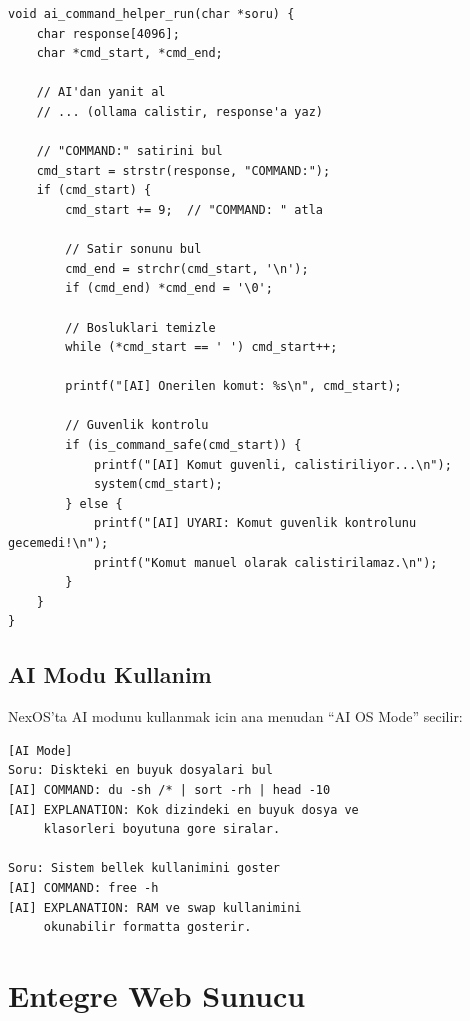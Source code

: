 \documentclass[12pt,a4paper]{report}
\begin{document}
\begin{lstlisting}[caption={AI Komut Yardimcisi}]
void ai_command_helper_run(char *soru) {
    char response[4096];
    char *cmd_start, *cmd_end;
    
    // AI'dan yanit al
    // ... (ollama calistir, response'a yaz)
    
    // "COMMAND:" satirini bul
    cmd_start = strstr(response, "COMMAND:");
    if (cmd_start) {
        cmd_start += 9;  // "COMMAND: " atla
        
        // Satir sonunu bul
        cmd_end = strchr(cmd_start, '\n');
        if (cmd_end) *cmd_end = '\0';
        
        // Bosluklari temizle
        while (*cmd_start == ' ') cmd_start++;
        
        printf("[AI] Onerilen komut: %s\n", cmd_start);
        
        // Guvenlik kontrolu
        if (is_command_safe(cmd_start)) {
            printf("[AI] Komut guvenli, calistiriliyor...\n");
            system(cmd_start);
        } else {
            printf("[AI] UYARI: Komut guvenlik kontrolunu gecemedi!\n");
            printf("Komut manuel olarak calistirilamaz.\n");
        }
    }
}
\end{lstlisting}

\section{AI Modu Kullanim}

NexOS'ta AI modunu kullanmak icin ana menudan ``AI OS Mode'' secilir:

\begin{lstlisting}[style=bashstyle,caption={AI Modu Ornekleri}]
[AI Mode]
Soru: Diskteki en buyuk dosyalari bul
[AI] COMMAND: du -sh /* | sort -rh | head -10
[AI] EXPLANATION: Kok dizindeki en buyuk dosya ve 
     klasorleri boyutuna gore siralar.

Soru: Sistem bellek kullanimini goster
[AI] COMMAND: free -h
[AI] EXPLANATION: RAM ve swap kullanimini 
     okunabilir formatta gosterir.
\end{lstlisting}

\chapter{Entegre Web Sunucu}
\end{document}

